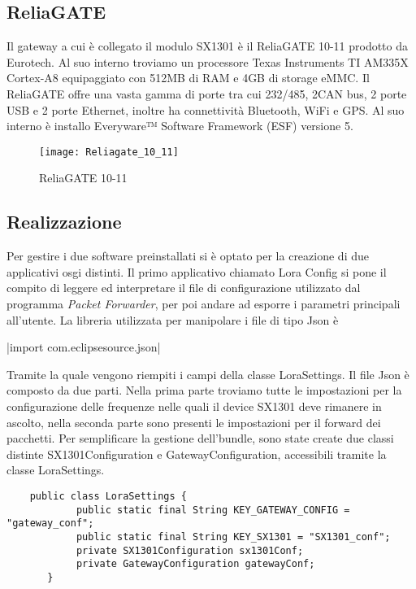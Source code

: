 \subsection{ReliaGATE}
Il gateway a cui è collegato il modulo SX1301 è il ReliaGATE 10-11 prodotto da
Eurotech. Al suo interno troviamo un processore Texas Instruments TI AM335X Cortex-A8 
equipaggiato con 512MB di RAM e 4GB di storage eMMC. Il ReliaGATE offre una
vasta gamma di porte tra cui 232/485, 2CAN bus, 2 porte USB e 2 porte Ethernet,
inoltre ha connettività Bluetooth, WiFi e GPS. Al suo interno è installo
Everyware™ Software Framework (ESF) versione 5.
\begin{figure}[h]
        \centering 
                \texttt{[image: Reliagate\_10\_11]}
        \caption{ReliaGATE 10-11}
        \label{fig:ReliaGATE}
\end{figure}



\subsection{Realizzazione}
Per gestire i due software preinstallati si è optato per la creazione di due
applicativi osgi distinti.
Il primo applicativo chiamato Lora Config si pone il compito di leggere ed
interpretare il file di configurazione utilizzato dal programma \emph{Packet
Forwarder}, per poi andare ad esporre i parametri principali all'utente.
La libreria utilizzata per manipolare i file di tipo Json è 

|import com.eclipsesource.json|

Tramite la quale vengono riempiti i campi della classe LoraSettings. Il file
Json è composto da due parti. Nella prima parte
troviamo tutte le impostazioni per la configurazione delle frequenze nelle quali
il device SX1301 deve rimanere in ascolto, nella seconda
parte sono presenti le impostazioni per il forward dei pacchetti. 
Per semplificare la gestione dell'bundle, sono state create due classi distinte
SX1301Configuration e GatewayConfiguration, accessibili tramite la classe LoraSettings.

\begin{verbatim}
    public class LoraSettings {
            public static final String KEY_GATEWAY_CONFIG = "gateway_conf";
            public static final String KEY_SX1301 = "SX1301_conf";
            private SX1301Configuration sx1301Conf;
            private GatewayConfiguration gatewayConf;
       } 
\end{verbatim}

